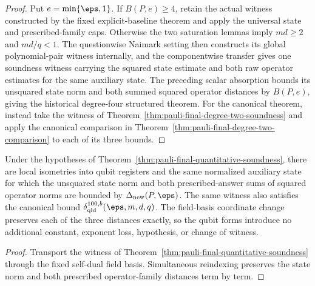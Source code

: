 \begin{proof}
\leanok
{}
Put $e=\min\{\eps,1\}$.  If $B(P,e)\geq4$, retain the actual witness
constructed by the fixed explicit-baseline theorem and apply the universal
state and prescribed-family caps.  Otherwise the two saturation lemmas imply
$md\geq2$ and $md/q<1$.  The questionwise Naimark setting then constructs its
global polynomial-pair witness internally, and the componentwise transfer
gives one soundness witness carrying the squared state estimate and both raw
operator estimates for the same auxiliary state.  The preceding scalar
absorption bounds its unsquared state norm and both summed squared operator
distances by $B(P,e)$, giving the historical degree-four structured theorem.
For the canonical theorem, instead take the witness of
Theorem~\ref{thm:pauli-final-degree-two-soundness} and apply the canonical
comparison in Theorem~\ref{thm:pauli-final-degree-two-comparison} to each of
its three bounds.
\end{proof}

\begin{corollary}
\label{cor:pauli-final-quantitative-qubit}
\leanok
{}
Under the hypotheses of
Theorem~\ref{thm:pauli-final-quantitative-soundness}, there are local
isometries into qubit registers and the same normalized auxiliary state for
which the unsquared state norm and both prescribed-answer sums of squared
operator norms are bounded by $\Delta_{\mathrm{new}}(P,\eps)$.  The same
witness also satisfies the canonical bound
$\delta_{\mathrm{qld}}^{100,b}(\eps,m,d,q)$.  The field-basis coordinate
change preserves each of the three distances exactly, so the qubit forms
introduce no additional constant, exponent loss, hypothesis, or change of
witness.
\end{corollary}
\begin{proof}
\leanok
{}
Transport the witness of
Theorem~\ref{thm:pauli-final-quantitative-soundness} through the fixed
self-dual field basis.  Simultaneous reindexing preserves the state norm and
both prescribed operator-family distances term by term.
\end{proof}
